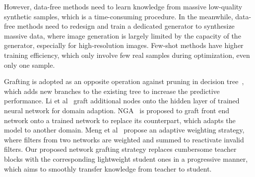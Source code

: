 \documentclass[letterpaper]{article} %
\begin{document}
{    However, data-free methods need to learn knowledge from massive low-quality synthetic samples, which is a time-consuming procedure.
    In the meanwhile, data-free methods need to redesign and train a dedicated generator to synthesize massive data, where image generation is largely limited by the capacity of the generator, especially for high-resolution images.
    Few-shot methods have higher training efficiency, which only involve few real samples during optimization, even only one sample.



    Grafting is adopted as an opposite operation against pruning in decision tree~\cite{webb1997decision,penttinen2003improving}, which adds new branches to the existing tree to increase the predictive performance.
    Li et al~\cite{li2012network} graft additional nodes onto the hidden layer of trained neural network for domain adaption.
    NGA~\cite{hu2020exploiting} is proposed to graft front end network onto a trained network to replace its counterpart, which adapts the model to another domain.
    Meng et al~\cite{meng2020filter} propose an adaptive weighting strategy, where filters from two networks are weighted and summed to reactivate invalid filters.
    Our proposed network grafting strategy replaces cumbersome teacher blocks with the corresponding lightweight student ones in a progressive manner, which aims to smoothly transfer knowledge from teacher to student.
}
\end{document}

